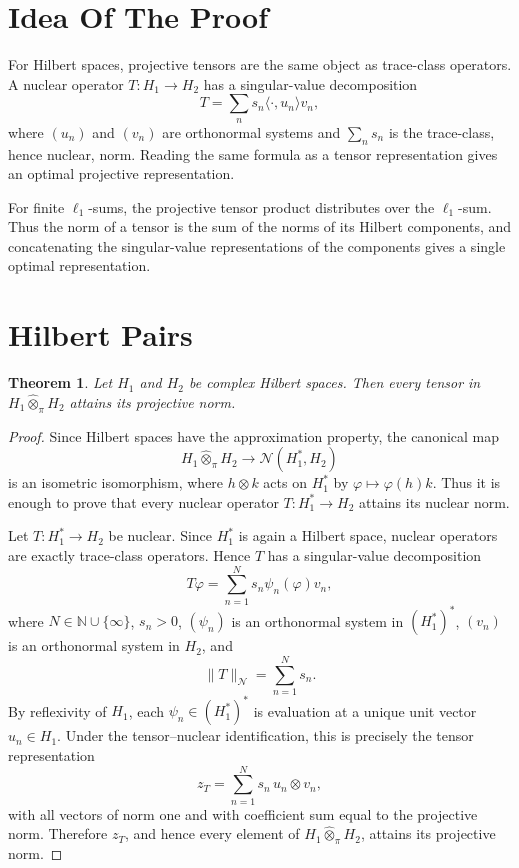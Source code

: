 \documentclass[11pt]{article}
\newtheorem{theorem}{Theorem}
\theoremstyle{remark}
\newcommand{\N}{\mathbb N}
\newcommand{\Nuc}{\mathcal N}
\begin{document}
\section{Idea Of The Proof}

For Hilbert spaces, projective tensors are the same object as trace-class
operators.  A nuclear operator \(T:H_1\to H_2\) has a singular-value
decomposition
\[
  T=\sum_n s_n \langle\cdot,u_n\rangle v_n,
\]
where \((u_n)\) and \((v_n)\) are orthonormal systems and
\(\sum_n s_n\) is the trace-class, hence nuclear, norm.  Reading the same
formula as a tensor representation gives an optimal projective representation.

For finite \(\ell_1\)-sums, the projective tensor product distributes over the
\(\ell_1\)-sum.  Thus the norm of a tensor is the sum of the norms of its
Hilbert components, and concatenating the singular-value representations of
the components gives a single optimal representation.

\section{Hilbert Pairs}

\begin{theorem}\label{thm:hilbert-pair}
Let \(H_1\) and \(H_2\) be complex Hilbert spaces.  Then every tensor in
\(H_1\widehat\otimes_\pi H_2\) attains its projective norm.
\end{theorem}

\begin{proof}
Since Hilbert spaces have the approximation property, the canonical map
\[
  H_1\widehat\otimes_\pi H_2 \longrightarrow
  \Nuc(H_1^*,H_2)
\]
is an isometric isomorphism, where \(h\otimes k\) acts on \(H_1^*\) by
\(\varphi\mapsto \varphi(h)k\).  Thus it is enough to prove that every nuclear
operator \(T:H_1^*\to H_2\) attains its nuclear norm.

Let \(T:H_1^*\to H_2\) be nuclear.  Since \(H_1^*\) is again a Hilbert space,
nuclear operators are exactly trace-class operators.  Hence \(T\) has a
singular-value decomposition
\[
  T\varphi=\sum_{n=1}^{N} s_n \psi_n(\varphi) v_n,
\]
where \(N\in\N\cup\{\infty\}\), \(s_n>0\), \((\psi_n)\) is an orthonormal
system in \((H_1^*)^*\), \((v_n)\) is an orthonormal system in \(H_2\), and
\[
  \|T\|_{\Nuc}=\sum_{n=1}^{N}s_n .
\]
By reflexivity of \(H_1\), each \(\psi_n\in (H_1^*)^*\) is evaluation at a
unique unit vector \(u_n\in H_1\).  Under the tensor--nuclear identification,
this is precisely the tensor representation
\[
  z_T=\sum_{n=1}^{N} s_n\, u_n\otimes v_n,
\]
with all vectors of norm one and with coefficient sum equal to the projective
norm.  Therefore \(z_T\), and hence every element of
\(H_1\widehat\otimes_\pi H_2\), attains its projective norm.
\end{proof}
\end{document}
